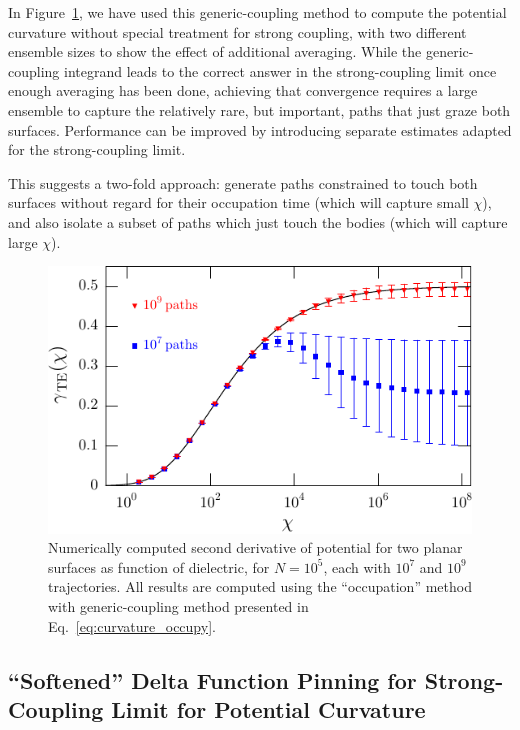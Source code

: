 In Figure~\ref{fig:curvature_a}, we have used this generic-coupling method to compute the potential curvature
without special treatment for strong coupling, with two different ensemble sizes to show the effect of additional averaging.  
While the generic-coupling integrand leads to the correct answer in the strong-coupling limit once enough
averaging has been done, achieving that convergence requires a large ensemble to capture the relatively rare, but important,
 paths that just graze both surfaces.
Performance can be improved by introducing separate estimates adapted for the strong-coupling limit.  

This suggests a two-fold approach: generate paths constrained to touch both surfaces without regard for their
occupation time (which will capture small $\chi$), and also isolate a subset of paths which just touch the 
bodies (which will capture large $\chi$).  

\begin{figure}
  \centering
  \includegraphics[width=0.8\columnwidth]{fig/numerics/curvature_a}
  \caption[Numerical TE Potential Curvature for two planar surfaces, evaluated with occupation method]{
    Numerically computed second derivative of potential for two planar surfaces as function 
    of dielectric, for $N=10^5$, each with $10^7$ and $10^9$ trajectories.  
    All results are computed using the ``occupation'' method with generic-coupling method presented in Eq.~\ref{eq:curvature_occupy}.}
\label{fig:curvature_a}
\end{figure}

\subsection{``Softened'' Delta Function Pinning for Strong-Coupling Limit for Potential Curvature}


